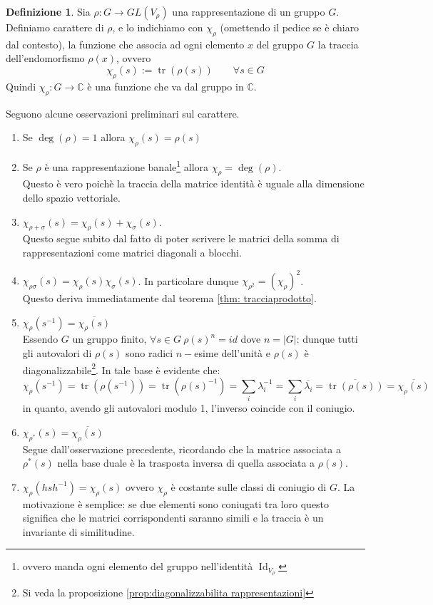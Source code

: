 \documentclass[11pt]{article}
\theoremstyle{plain}
\theoremstyle{definition}
\newtheorem{defn}{Definizione}[section]
\theoremstyle{remark}
\newcommand{\C}{\mathbb{C}}
\DeclareMathOperator{\tr}{tr}
\DeclareMathOperator{\Id}{Id}
\begin{document}
\begin{defn}
Sia $\rho: G \to GL(V_\rho)$ una rappresentazione di un gruppo $G$.
Definiamo carattere di $\rho$, e lo indichiamo con $\chi_\rho$ (omettendo il pedice se è chiaro dal contesto),
la funzione che associa ad ogni elemento $x$ del gruppo $G$ la traccia dell'endomorfismo $\rho(x)$, ovvero
\[\chi_\rho(s) := \tr(\rho(s)) \qquad \forall s \in G \]
Quindi $\chi_{\rho}: G \to \C$ è una funzione che va dal gruppo in $\C$.
\end{defn}
Seguono alcune osservazioni preliminari sul carattere.
\begin{enumerate}
	\item Se $\deg(\rho) = 1$ allora $\chi_\rho(s) = \rho(s)$
	\item Se $\rho$ è una rappresentazione banale\footnote{ovvero manda ogni elemento del gruppo nell'identità $\Id_{V_\rho}$} allora $\chi_\rho = \deg(\rho)$.\\
	Questo è vero poichè la traccia della matrice identità è uguale alla dimensione dello spazio vettoriale.
	\item $\chi_{\rho + \sigma}(s) = \chi_\rho(s) + \chi_\sigma(s)$.\\
	Questo segue subito dal fatto di poter scrivere le matrici della somma di rappresentazioni come matrici diagonali a blocchi.
	\item $\chi_{\rho\sigma}(s) = \chi_\rho(s)\chi_\sigma(s)$. In particolare dunque $\chi_{\rho^2}=(\chi_\rho)^2$.\\
	Questo deriva immediatamente dal teorema \ref{thm: tracciaprodotto}.
	\item $\chi_{\rho}(s^{-1})=\overline{\chi_{\rho}(s)}$\\
Essendo $G$ un gruppo finito, $\forall s\in G\ \rho(s)^n = id$ dove $n=|G|$: dunque tutti gli autovalori di $\rho(s)$ sono radici $n-$esime dell'unità e $\rho(s)$ è diagonalizzabile\footnote{Si veda la proposizione \ref{prop:diagonalizzabilita rappresentazioni}}. In tale base è evidente che:
$$\chi_{\rho}(s^{-1})=\tr(\rho (s^{-1}))=\tr(\rho (s)^{-1})=\sum_i\lambda_i^{-1}=\sum_i\overline{\lambda_i}=\overline{\tr(\rho(s))}=\overline{\chi_{\rho}(s)}$$
in quanto, avendo gli autovalori modulo 1, l'inverso coincide con il coniugio.
	\item $\chi_{\rho^*}(s) = \overline{\chi_{\rho}(s)}$\\
		Segue dall'osservazione precedente, ricordando che la matrice associata a $\rho^*(s)$ nella base duale è la trasposta inversa di quella associata a $\rho(s)$.
	\item $\chi_{\rho}(hsh^{-1})=\chi_{\rho}(s)$ ovvero $\chi_\rho$ è costante sulle classi di coniugio di $G$. La motivazione è semplice: se due elementi sono coniugati tra loro questo significa che le matrici corrispondenti saranno simili e la traccia è un invariante di similitudine.


\end{enumerate}
\end{document}
